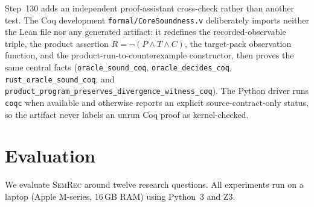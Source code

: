 \documentclass[10pt,a4paper]{article}
\begin{document}
Step~130 adds an independent proof-assistant cross-check rather than another
test.  The Coq development \texttt{formal/CoreSoundness.v} deliberately imports
neither the Lean file nor any generated artifact: it redefines the
recorded-observable triple, the product assertion \(R=\neg(P\wedge T\wedge C)\),
the target-pack observation function, and the product-run-to-counterexample
constructor, then proves the same central facts (\texttt{oracle\_sound\_coq},
\texttt{oracle\_decides\_coq}, \texttt{rust\_oracle\_sound\_coq}, and
\texttt{product\_program\_preserves\_divergence\_witness\_coq}).  The Python
driver runs \texttt{coqc} when available and otherwise reports an explicit
source-contract-only status, so the artifact never labels an unrun Coq proof as
kernel-checked.


\section{Evaluation}\label{sec:eval}

We evaluate \textsc{SemRec} around twelve research questions.
All experiments run on a laptop
(Apple M-series, 16\,GB RAM) using Python~3 and Z3.
\end{document}
